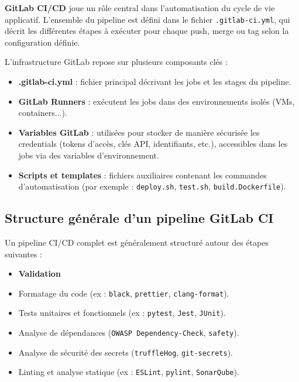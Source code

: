 \textbf{GitLab CI/CD} joue un rôle central dans l'automatisation du cycle de vie applicatif. L’ensemble du pipeline est défini dans le fichier \texttt{.gitlab-ci.yml}, qui décrit les différentes étapes à exécuter pour chaque push, merge ou tag selon la configuration définie.

L’infrastructure GitLab repose sur plusieurs composants clés :
\begin{itemize}
	\item \textbf{.gitlab-ci.yml} : fichier principal décrivant les jobs et les stages du pipeline.
	\item \textbf{GitLab Runners} : exécutent les jobs dans des environnements isolés (VMs, containers...).
	\item \textbf{Variables GitLab} : utilisées pour stocker de manière sécurisée les credentials (tokens d’accès, clés API, identifiants, etc.), accessibles dans les jobs via des variables d’environnement.
	\item \textbf{Scripts et templates} : fichiers auxiliaires contenant les commandes d’automatisation (par exemple : \texttt{deploy.sh}, \texttt{test.sh}, \texttt{build.Dockerfile}).
\end{itemize}

\subsection{Structure générale d’un pipeline GitLab CI}

Un pipeline CI/CD complet est généralement structuré autour des étapes suivantes :

\begin{itemize}
	\item \textbf{Validation}
	\item Formatage du code (ex : \texttt{black}, \texttt{prettier}, \texttt{clang-format}).
	\item Tests unitaires et fonctionnels (ex : \texttt{pytest}, \texttt{Jest}, \texttt{JUnit}).
	\item Analyse de dépendances (\texttt{OWASP Dependency-Check}, \texttt{safety}).
	\item Analyse de sécurité des secrets (\texttt{truffleHog}, \texttt{git-secrets}).
	\item Linting et analyse statique (ex : \texttt{ESLint}, \texttt{pylint}, \texttt{SonarQube}).
\end{itemize}

